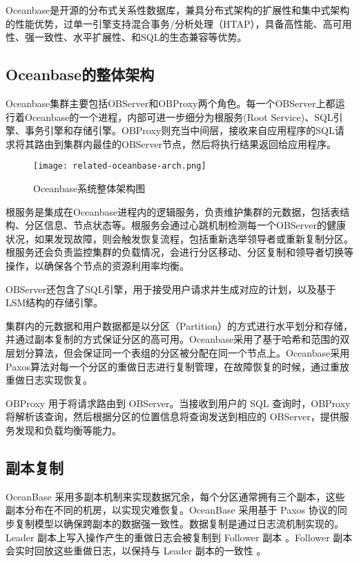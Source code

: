 Oceanbase是开源的分布式关系性数据库，兼具分布式架构的扩展性和集中式架构的性能优势，过单一引擎支持混合事务/分析处理（HTAP），具备高性能、高可用性、强一致性、水平扩展性、和SQL的生态兼容等优势。

\subsection{Oceanbase的整体架构}

Oceanbase集群主要包括OBServer和OBProxy两个角色。每一个OBServer上都运行着Oceanbase的一个进程，内部可进一步细分为根服务(Root Service)、SQL引擎、事务引擎和存储引擎。OBProxy则充当中间层，接收来自应用程序的SQL请求将其路由到集群内最佳的OBServer节点，然后将执行结果返回给应用程序。

\begin{figure}
  \centering
  \texttt{[image: related-oceanbase-arch.png]}
  \caption{Oceanbase系统整体架构图}
  \label{fig:oceanbase-arch}
\end{figure}

根服务是集成在Oceanbase进程内的逻辑服务，负责维护集群的元数据，包括表结构、分区信息、节点状态等。根服务会通过心跳机制检测每一个OBServer的健康状况，如果发现故障，则会触发恢复流程，包括重新选举领导者或重新复制分区。根服务还会负责监控集群的负载情况，会进行分区移动、分区复制和领导者切换等操作，以确保各个节点的资源利用率均衡。

OBServer还包含了SQL引擎，用于接受用户请求并生成对应的计划，以及基于LSM结构的存储引擎。

集群内的元数据和用户数据都是以分区（Partition）的方式进行水平划分和存储，并通过副本复制的方式保证分区的高可用。Oceanbase采用了基于哈希和范围的双层划分算法，但会保证同一个表组的分区被分配在同一个节点上。Oceanbase采用Paxos算法对每一个分区的重做日志进行复制管理，在故障恢复的时候，通过重放重做日志实现恢复。

OBProxy 用于将请求路由到 OBServer。当接收到用户的 SQL 查询时，OBProxy 将解析该查询，然后根据分区的位置信息将查询发送到相应的 OBServer，提供服务发现和负载均衡等能力。


\subsection{副本复制}

OceanBase 采用多副本机制来实现数据冗余，每个分区通常拥有三个副本，这些副本分布在不同的机房，以实现灾难恢复。OceanBase 采用基于 Paxos 协议的同步复制模型以确保跨副本的数据强一致性。数据复制是通过日志流机制实现的。Leader 副本上写入操作产生的重做日志会被复制到 Follower 副本 。Follower 副本会实时回放这些重做日志，以保持与 Leader 副本的一致性 。


